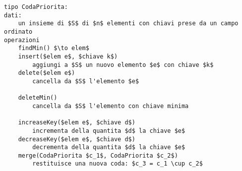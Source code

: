 
\begin{lstlisting}[mathescape=True]
tipo CodaPriorita:
dati:
    un insieme di $S$ di $n$ elementi con chiavi prese da un campo ordinato
operazioni
    findMin() $\to elem$
    insert($elem e$, $chiave k$)
        aggiungi a $S$ un nuovo elemento $e$ con chiave $k$
    delete($elem e$)
        cancella da $S$ l'elemento $e$

    deleteMin()
        cancella da $S$ l'elemento con chiave minima
    
    increaseKey($elem e$, $chiave d$)
        incrementa della quantita $d$ la chiave $e$
    decreaseKey($elem e$, $chiave d$)
        decrementa della quantita $d$ la chiave $e$
    merge(CodaPriorita $c_1$, CodaPriorita $c_2$)
        restituisce una nuova coda: $c_3 = c_1 \cup c_2$
\end{lstlisting}